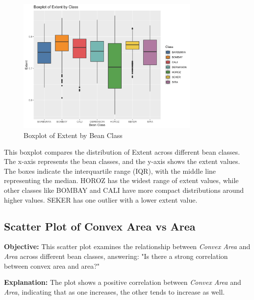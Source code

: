 \documentclass[a4paper,12pt]{article}
\begin{document}
\begin{figure}[H]
    \centering
    \includegraphics[width=0.8\textwidth]{graphs/boxplot_extent.png}
    \caption{Boxplot of Extent by Bean Class}
    \label{fig:boxplot_extent}
\end{figure}
This boxplot compares the distribution of Extent across different bean classes. The x-axis represents the bean classes, and the y-axis shows the extent values. The boxes indicate the interquartile range (IQR), with the middle line representing the median. HOROZ has the widest range of extent values, while other classes like BOMBAY and CALI have more compact distributions around higher values. SEKER has one outlier with a lower extent value.

\newpage

\subsection{Scatter Plot of Convex Area vs Area}
\noindent\textbf{Objective:} This scatter plot examines the relationship between \textit{Convex Area} and \textit{Area} across different bean classes, answering: "Is there a strong correlation between convex area and area?"

\noindent\textbf{Explanation:} The plot shows a positive correlation between \textit{Convex Area} and \textit{Area}, indicating that as one increases, the other tends to increase as well.
\end{document}
